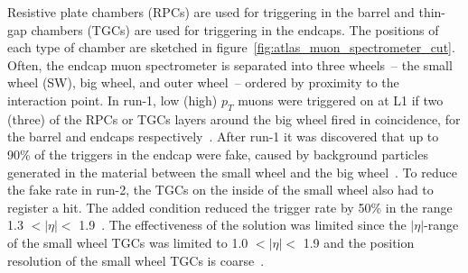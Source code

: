Resistive plate chambers (RPCs) are used for triggering in the barrel and thin-gap chambers (TGCs) are used for triggering in the endcaps. The positions of each type of chamber are sketched in figure~\ref{fig:atlas_muon_spectrometer_cut}. Often, the endcap muon spectrometer is separated into three wheels~-- the small wheel (SW), big wheel, and outer wheel~-- ordered by proximity to the interaction point. In run-1, low (high) $p_T$ muons were triggered on at L1 if two (three) of the RPCs or TGCs layers around the big wheel fired in coincidence, for the barrel and endcaps respectively~\cite{atlas_l1_trigger_tdr}. After run-1 it was discovered that up to 90\% of the triggers in the endcap were fake, caused by background particles generated in the material between the small wheel and the big wheel~\cite{nsw_tdr}.  To reduce the fake rate in run-2, the TGCs on the inside of the small wheel also had to register a hit. The added condition reduced the trigger rate by 50\% in the range 1.3 $< |\eta| <$ 1.9~\cite{martinez_run-2_2016}. The effectiveness of the solution was limited since the $|\eta|$-range of the small wheel TGCs was limited to 1.0 $< |\eta| <$ 1.9 and the position resolution of the small wheel TGCs is coarse~\cite{nsw_tdr}.


